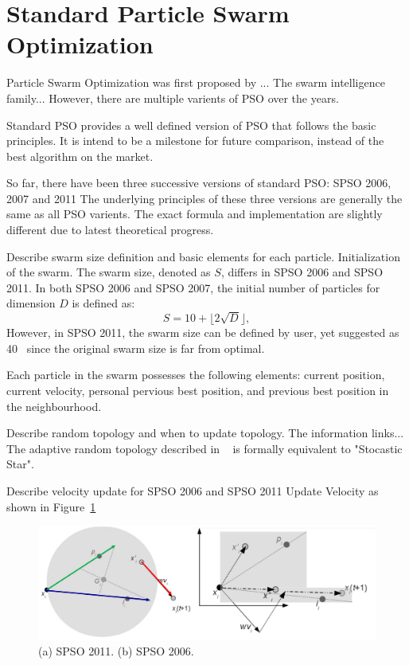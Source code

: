 \section{Standard Particle Swarm Optimization}

Particle Swarm Optimization was first proposed by ...
The swarm intelligence family... 
However, there are multiple varients of PSO over the years.

Standard PSO provides a well defined version of PSO that follows the basic principles.
It is intend to be a milestone for future comparison, instead of the best algorithm on the market.

So far, there have been three successive versions of standard PSO: SPSO 2006, 2007 and 2011
The underlying principles of these three versions are generally the same as all PSO varients.
The exact formula and implementation are slightly different due to latest theoretical progress.

Describe swarm size definition and basic elements for each particle.
Initialization of the swarm.
The swarm size, denoted as $S$, differs in SPSO 2006 and SPSO 2011.
In both SPSO 2006 and SPSO 2007, the initial number of particles for dimension $D$ is defined as:
\begin{displaymath}
S = 10 + \lfloor 2\sqrt{D} \rfloor,
\end{displaymath}
However, in SPSO 2011, the swarm size can be defined by user, yet suggested as 40~\cite{Clerc:2012:SPSO2011} since the original swarm size is far from optimal.

Each particle in the swarm possesses the following elements: current position, current velocity, personal pervious best position, and previous best position in the neighbourhood. 


Describe random topology and when to update topology.
The information links...
The adaptive random topology described in ~\cite{Clerc:2007:randomTopology} is formally equivalent to "Stocastic Star".

Describe velocity update for SPSO 2006 and SPSO 2011
Update Velocity as shown in Figure~\ref{fig:SPSO_update}
\begin{figure}
\centering
\includegraphics[width=\textwidth]{SPSO_update}
\caption{(a) SPSO 2011. (b) SPSO 2006.}\label{fig:SPSO_update}
\end{figure}


